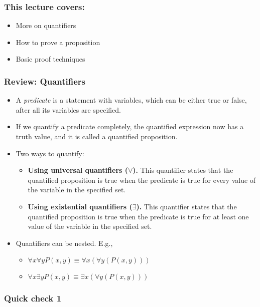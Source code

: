 

\begin{frame}\frametitle{This lecture covers:}
  \begin{itemize}
  \item More on quantifiers
  \item How to prove a proposition
  \item Basic proof techniques
  \end{itemize}
\end{frame}

\begin{frame}\frametitle{Review: Quantifiers}
  \begin{itemize}
  \item A {\em predicate} is a statement with variables, which can be
    either true or false, after all its variables are specified.
  \item If we quantify a predicate completely, the quantified
    expression now has a truth value, and it is called a quantified
    proposition.
  \item Two ways to quantify:
    \begin{itemize}
    \item {\bf Using universal quantifiers ($\forall$).} This
      quantifier states that the quantified proposition is true when
      the predicate is true for every value of the variable in the
      specified set.
    \item {\bf Using existential quantifiers ($\exists$).} This
      quantifier states that the quantified proposition is true when
      the predicate is true for at least one value of the variable in
      the specified set.
    \end{itemize}

  \item Quantifiers can be nested.  E.g., 
    \begin{itemize}
    \item $\forall x\forall y P(x,y)\equiv \forall x(\forall y (P(x,y)))$
    \item $\forall x\exists y P(x,y)\equiv \exists x(\forall y (P(x,y)))$
    \end{itemize}
  \end{itemize}
\end{frame}

\begin{frame}\frametitle{Quick check 1}
\end{frame}

